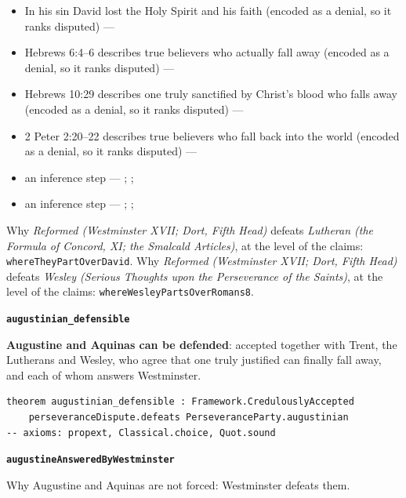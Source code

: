 \documentclass[11pt]{article}
\begin{document}
\begin{itemize}
\begin{itemize}
\item In his sin David lost the Holy Spirit and his faith (encoded as a denial, so it ranks disputed) --- \cite[299--300]{calvin-psalms-2-1846}
\item Hebrews 6:4–6 describes true believers who actually fall away (encoded as a denial, so it ranks disputed) --- \cite[137--138]{calvin-hebrews-1853}
\item Hebrews 10:29 describes one truly sanctified by Christ’s blood who falls away (encoded as a denial, so it ranks disputed) --- \cite[545--546]{owen-works-23-1855}
\item 2 Peter 2:20–22 describes true believers who fall back into the world (encoded as a denial, so it ranks disputed) --- \cite[410--412]{calvin-commentaries-catholic-epistles}
\item an inference step --- \cite[444--445]{wesley-works-9-1827}; \cite[415--416]{calvin-commentary-john-1847}; \cite[Solid Declaration XI.45]{concordia-triglotta-1921}
\item an inference step --- \cite[Trent, Session VI (1547), ch. 13]{tanner-decrees-1990}; \cite[40]{waterworth-trent-1848}; \cite[Solid Declaration XI.42]{concordia-triglotta-1921}
\end{itemize}
\end{itemize}
\noindent Why \emph{Reformed (Westminster XVII; Dort, Fifth Head)} defeats \emph{Lutheran (the Formula of Concord, XI; the Smalcald Articles)}, at the level of the claims: \texttt{where\allowbreak{}They\allowbreak{}Part\allowbreak{}Over\allowbreak{}David}.
\noindent Why \emph{Reformed (Westminster XVII; Dort, Fifth Head)} defeats \emph{Wesley (Serious Thoughts upon the Perseverance of the Saints)}, at the level of the claims: \texttt{where\allowbreak{}Wesley\allowbreak{}Parts\allowbreak{}Over\allowbreak{}Romans8}.
\par\medskip\noindent\textbf{\texttt{augustinian\_\allowbreak{}defensible}}\par\nobreak\noindent
\textbf{Augustine and Aquinas can be defended}: accepted together with Trent, the Lutherans and Wesley, who agree that one truly justified can finally fall away, and each of whom answers Westminster.

{\small\begin{verbatim}
theorem augustinian_defensible : Framework.CredulouslyAccepted
    perseveranceDispute.defeats PerseveranceParty.augustinian
-- axioms: propext, Classical.choice, Quot.sound
\end{verbatim}}
\par\medskip\noindent\textbf{\texttt{augustine\allowbreak{}Answered\allowbreak{}By\allowbreak{}Westminster}}\par\nobreak\noindent
Why Augustine and Aquinas are not forced: Westminster defeats them.
\end{document}
